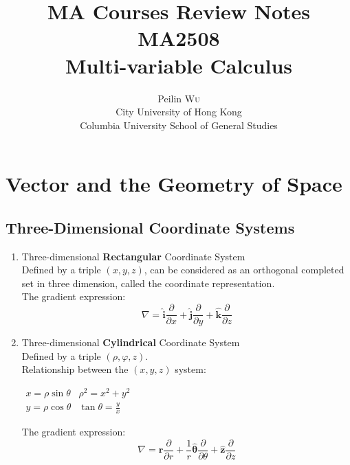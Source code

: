 \documentclass[UTF8,a4paper, 10pt, openany]{book}
\title{MA Courses Review Notes\\MA2508\\Multi-variable Calculus}
\author{Peilin \textsc{Wu}\\ City University of Hong Kong\\Columbia University School of General Studies}
\begin{document}
\maketitle
\tableofcontents

\chapter{Vector and the Geometry of Space}
\section{Three-Dimensional Coordinate Systems}
\begin{enumerate}
\item Three-dimensional \textbf{Rectangular} Coordinate System
\\Defined by a triple $(x, y, z)$, can be considered as an orthogonal completed set in three dimension, called the coordinate representation. \\
The gradient expression:
\begin{equation}
 \boxed{\nabla = \mathbf{\hat{i}}\dfrac{\partial }{\partial x}+\mathbf{\hat{j}}\dfrac{\partial }{\partial y}+\mathbf{\hat{k}}\dfrac{\partial }{\partial z}}
\end{equation}

\item Three-dimensional \textbf{Cylindrical} Coordinate System
\\Defined by a triple $(\rho, \varphi, z)$.\\
Relationship between the $(x, y, z)$ system:
\begin{center}
$\begin{array}{cc}
x = \rho \sin \theta  &  \rho ^2 = x^2+y^2\\
y = \rho \cos \theta  &  \tan \theta = \frac{y}{x}
\end{array}$
\end{center}
The gradient expression:
\begin{equation}
 \boxed{\nabla = \mathbf{\hat{r}}\dfrac{\partial }{\partial r}+\dfrac{1}{r}\mathbf{\hat{\theta}}\dfrac{\partial }{\partial \theta}+\mathbf{\hat{z}}\dfrac{\partial }{\partial z}}
\end{equation}


\end{enumerate}
\end{document}
